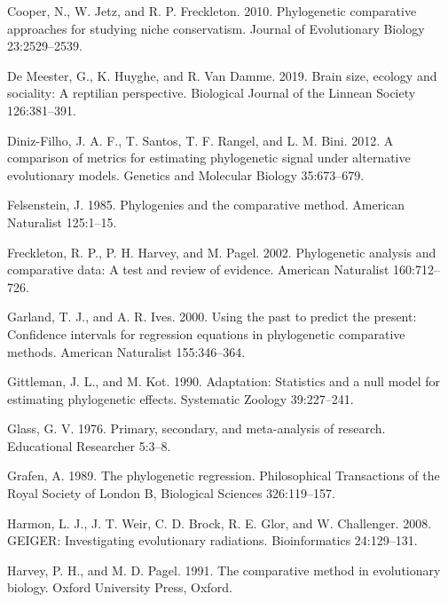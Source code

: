 \documentclass[
]{article}
\begin{document}
\leavevmode\hypertarget{ref-Cooper2010}{}%
Cooper, N., W. Jetz, and R. P. Freckleton. 2010. Phylogenetic
comparative approaches for studying niche conservatism. Journal of
Evolutionary Biology 23:2529--2539.

\leavevmode\hypertarget{ref-DeMeester2019}{}%
De Meester, G., K. Huyghe, and R. Van Damme. 2019. Brain size, ecology
and sociality: A reptilian perspective. Biological Journal of the
Linnean Society 126:381--391.

\leavevmode\hypertarget{ref-DinizFilho2012}{}%
Diniz-Filho, J. A. F., T. Santos, T. F. Rangel, and L. M. Bini. 2012. A
comparison of metrics for estimating phylogenetic signal under
alternative evolutionary models. Genetics and Molecular Biology
35:673--679.

\leavevmode\hypertarget{ref-Felsenstein1985}{}%
Felsenstein, J. 1985. Phylogenies and the comparative method. American
Naturalist 125:1--15.

\leavevmode\hypertarget{ref-Freckleton_et_al2002}{}%
Freckleton, R. P., P. H. Harvey, and M. Pagel. 2002. Phylogenetic
analysis and comparative data: A test and review of evidence. American
Naturalist 160:712--726.

\leavevmode\hypertarget{ref-GarlandIves2000}{}%
Garland, T. J., and A. R. Ives. 2000. Using the past to predict the
present: Confidence intervals for regression equations in phylogenetic
comparative methods. American Naturalist 155:346--364.

\leavevmode\hypertarget{ref-Gittleman1990}{}%
Gittleman, J. L., and M. Kot. 1990. Adaptation: Statistics and a null
model for estimating phylogenetic effects. Systematic Zoology
39:227--241.

\leavevmode\hypertarget{ref-Glass1976}{}%
Glass, G. V. 1976. Primary, secondary, and meta-analysis of research.
Educational Researcher 5:3--8.

\leavevmode\hypertarget{ref-Grafen1989}{}%
Grafen, A. 1989. The phylogenetic regression. Philosophical Transactions
of the Royal Society of London B, Biological Sciences 326:119--157.

\leavevmode\hypertarget{ref-Harmon2008}{}%
Harmon, L. J., J. T. Weir, C. D. Brock, R. E. Glor, and W. Challenger.
2008. GEIGER: Investigating evolutionary radiations. Bioinformatics
24:129--131.

\leavevmode\hypertarget{ref-HarveyPagel1991}{}%
Harvey, P. H., and M. D. Pagel. 1991. The comparative method in
evolutionary biology. Oxford University Press, Oxford.
\end{document}
